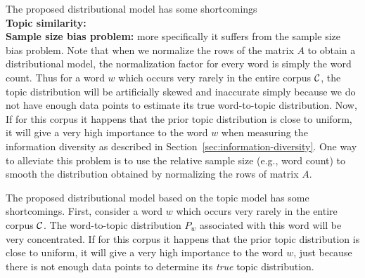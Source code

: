 \documentclass{article} %
\begin{document}
The proposed distributional model has some
shortcomings\\

{\bf Topic similarity:}\\ 

{\bf Sample size bias problem:} more specifically it suffers from the sample size bias problem. Note that 
when we normalize the rows of the matrix $A$ to obtain a distributional model, the normalization factor 
for every word is simply the word count. Thus for a word $w$ which occurs very rarely
in the entire corpus ${\mathcal C}$, the topic distribution will be artificially skewed and inaccurate simply because we do not have enough data points to estimate its true word-to-topic distribution.
Now, If for this corpus it happens that the prior topic distribution is close to uniform, it will give a very high importance to the word $w$ when measuring the information diversity as described in Section~\ref{sec:information-diversity}. One way to alleviate this problem is to use the relative sample size (e.g., word count) to smooth the distribution obtained by normalizing the rows of matrix $A$.




The proposed distributional model based on the topic model has some
shortcomings. First, consider a word $w$ which occurs very rarely
in the entire corpus ${\mathcal C}$. The word-to-topic distribution $P_w$ associated with this word
will be very concentrated. If for this corpus it happens that the prior topic distribution 
is close to uniform, it will give a very high importance to the word $w$, just because
there is not enough data points to determine its {\em true} topic distribution. 
\end{document}
